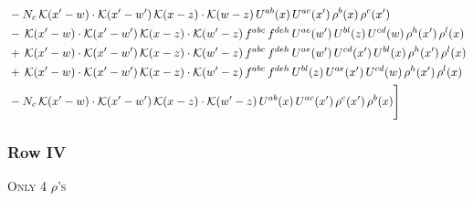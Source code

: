 \documentclass[9pt]{article}
\numberwithin{equation}{section}
\begin{document}
\begin{align}
& -N_{c}\,\mathcal{K}(x'-w)\cdot\mathcal{K}(x'-w')\,\mathcal{K}(x-z)\cdot\mathcal{K}(w-z)\,U^{ab}(x)\,U^{ac}(x')\,\rho^{b}(x)\,\rho^{c}(x')\notag\\
& -\,\mathcal{K}(x'-w)\cdot\mathcal{K}(x'-w')\,\mathcal{K}(x-z)\cdot\mathcal{K}(w'-z)\,f^{abc}\,f^{deh}\,U^{ae}(w')\,U^{bl}(z)\,U^{cd}(w)\,\rho^{h}(x')\,\rho^{l}(x)\notag\\
& +\,\mathcal{K}(x'-w)\cdot\mathcal{K}(x'-w')\,\mathcal{K}(x-z)\cdot\mathcal{K}(w'-z)\,f^{abc}\,f^{deh}\,U^{ae}(w')\,U^{cd}(x')\,U^{bl}(x)\,\rho^{h}(x')\,\rho^{l}(x)\notag\\
& +\,\mathcal{K}(x'-w)\cdot\mathcal{K}(x'-w')\,\mathcal{K}(x-z)\cdot\mathcal{K}(w'-z)\,f^{abc}\,f^{deh}\,U^{bl}(z)\,U^{ae}(x')\,U^{cd}(w)\,\rho^{h}(x')\,\rho^{l}(x)\notag\\
& -N_{c}\,\mathcal{K}(x'-w)\cdot\mathcal{K}(x'-w')\,\mathcal{K}(x-z)\cdot\mathcal{K}(w'-z)\,U^{ab}(x)\,U^{ac}(x')\,\rho^{c}(x')\,\rho^{b}(x)\Bigg]
\end{align}
\subsubsection{Row IV}
\textsc{Only 4 $\rho$'s}
\end{document}

